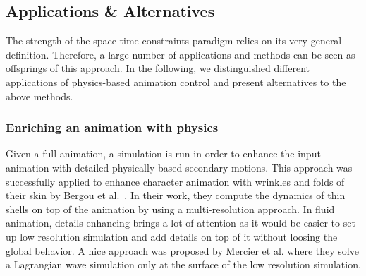 \subsection{Applications \& Alternatives}
The strength of the space-time constraints paradigm relies on its very general definition. Therefore, a large number of applications and methods can be seen as offsprings of this approach. In the following, we distinguished different applications of physics-based animation control and present alternatives to the above methods.

\subsubsection{Enriching an animation with physics}
Given a full animation, a simulation is run in order to enhance the input animation with detailed physically-based secondary motions. This approach was successfully applied to enhance character animation with wrinkles and folds of their skin by Bergou et al.~\cite{Bergou2007}. In their work, they compute the dynamics of thin shells on top of the animation by using a multi-resolution approach. In fluid animation, details enhancing brings a lot of attention as it would be easier to set up low resolution simulation and add details on top of it without loosing the global behavior. A nice approach was proposed by Mercier et al. \cite{Mercier2015} where they solve a Lagrangian wave simulation only at the surface of the low resolution simulation.

